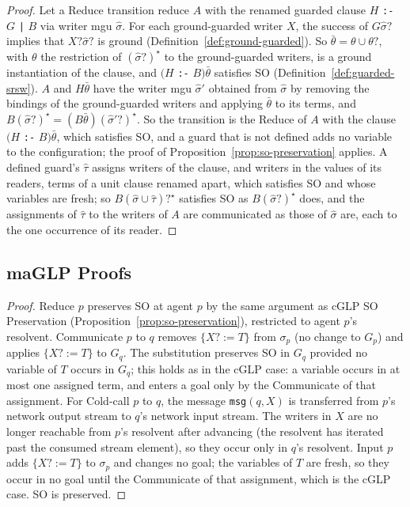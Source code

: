 \begin{proof}
Let a Reduce transition reduce $A$ with the renamed guarded clause $H$ \texttt{:-} $G$ \texttt{|} $B$ via writer mgu $\hat\sigma$. For each ground-guarded writer $X$, the success of $G\hat\sigma?$ implies that $X?\hat\sigma?$ is ground (Definition~\ref{def:ground-guarded}). So $\bar\theta = \theta \cup \theta?$, with $\theta$ the restriction of $(\hat\sigma?)^\star$ to the ground-guarded writers, is a ground instantiation of the clause, and $(H$ \texttt{:-} $B)\bar\theta$ satisfies SO (Definition~\ref{def:guarded-srsw}). $A$ and $H\bar\theta$ have the writer mgu $\hat\sigma'$ obtained from $\hat\sigma$ by removing the bindings of the ground-guarded writers and applying $\bar\theta$ to its terms, and $B(\hat\sigma?)^\star = (B\bar\theta)(\hat\sigma'?)^\star$. So the transition is the Reduce of $A$ with the clause $(H$ \texttt{:-} $B)\bar\theta$, which satisfies SO, and a guard that is not defined adds no variable to the configuration; the proof of Proposition~\ref{prop:so-preservation} applies. A defined guard's $\hat\tau$ assigns writers of the clause, and writers in the values of its readers, terms of a unit clause renamed apart, which satisfies SO and whose variables are fresh; so $B(\hat\sigma \cup \hat\tau)?^\star$ satisfies SO as $B(\hat\sigma?)^\star$ does, and the assignments of $\hat\tau$ to the writers of $A$ are communicated as those of $\hat\sigma$ are, each to the one occurrence of its reader.
\end{proof}

\subsection{maGLP Proofs}
\label{app:maglp-proofs}

\propMaGLPSOPreservation*

\begin{proof}
Reduce $p$ preserves SO at agent $p$ by the same argument as cGLP SO Preservation (Proposition~\ref{prop:so-preservation}), restricted to agent $p$'s resolvent. Communicate $p$ to $q$ removes $\{X? := T\}$ from $\sigma_p$ (no change to $G_p$) and applies $\{X? := T\}$ to $G_q$. The substitution preserves SO in $G_q$ provided no variable of $T$ occurs in $G_q$; this holds as in the cGLP case: a variable occurs in at most one assigned term, and enters a goal only by the Communicate of that assignment. For Cold-call $p$ to $q$, the message \verb|msg|$(q,X)$ is transferred from $p$'s network output stream to $q$'s network input stream. The writers in $X$ are no longer reachable from $p$'s resolvent after advancing (the resolvent has iterated past the consumed stream element), so they occur only in $q$'s resolvent. Input $p$ adds $\{X? := T\}$ to $\sigma_p$ and changes no goal; the variables of $T$ are fresh, so they occur in no goal until the Communicate of that assignment, which is the cGLP case. SO is preserved.
\end{proof}

